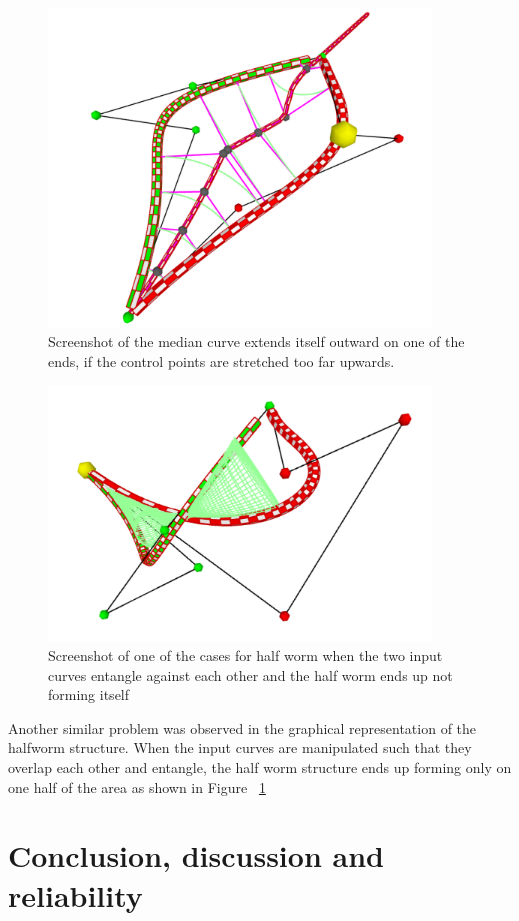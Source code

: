 \documentclass[twoside,11pt]{article}
\begin{document}
\begin{figure} [H]
    \centering
    \includegraphics[width=04in]{problemCase1.png}
    \caption{Screenshot of the median curve extends itself outward on one of the ends, if the control points are stretched too far upwards.}
\end{figure}

\begin{figure} [H]
    \centering
    \includegraphics[width=04in]{problemCase2.png}
    \caption{Screenshot of one of the cases for half worm when the two input curves entangle against each other and the half worm ends up not forming itself}
    \label{fig:halfWorm2}
\end{figure}

Another similar problem was observed in the graphical representation of the halfworm structure. When the input curves are manipulated such that they overlap each other and entangle, the half worm structure ends up forming only on one half of the area as shown in Figure ~\ref{fig:halfWorm2}





\section{Conclusion, discussion and reliability}
\end{document}
